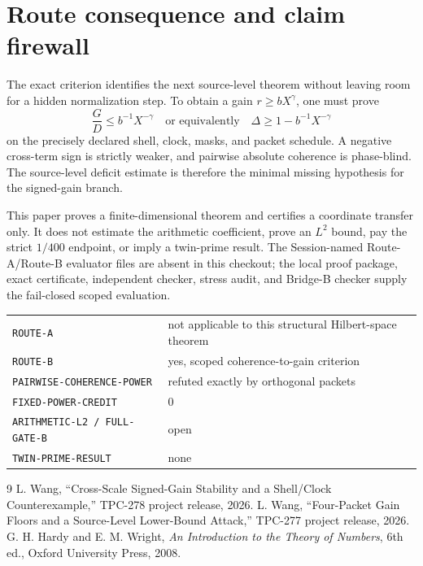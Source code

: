 \documentclass[11pt]{article}
\begin{document}
\section{Route consequence and claim firewall}

The exact criterion identifies the next source-level theorem without leaving
room for a hidden normalization step.  To obtain a gain
$r\geq bX^\gamma$, one must prove
\[
 \frac{G}{D}\leq b^{-1}X^{-\gamma}
 \quad\text{or equivalently}\quad
 \Delta\geq1-b^{-1}X^{-\gamma}
\]
on the precisely declared shell, clock, masks, and packet schedule.  A
negative cross-term sign is strictly weaker, and pairwise absolute coherence
is phase-blind.  The source-level deficit estimate is therefore the minimal
missing hypothesis for the signed-gain branch.

This paper proves a finite-dimensional theorem and certifies a coordinate
transfer only.  It does not estimate the arithmetic coefficient, prove an
$L^2$ bound, pay the strict $1/400$ endpoint, or imply a twin-prime result.
The Session-named Route-A/Route-B evaluator files are absent in this checkout;
the local proof package, exact certificate, independent checker, stress audit,
and Bridge-B checker supply the fail-closed scoped evaluation.

\begin{center}
\begin{tabular}{ll}
\texttt{ROUTE-A} & not applicable to this structural Hilbert-space theorem\\
\texttt{ROUTE-B} & yes, scoped coherence-to-gain criterion\\
\texttt{PAIRWISE-COHERENCE-POWER} & refuted exactly by orthogonal packets\\
\texttt{FIXED-POWER-CREDIT} & 0\\
\texttt{ARITHMETIC-L2 / FULL-GATE-B} & open\\
\texttt{TWIN-PRIME-RESULT} & none
\end{tabular}
\end{center}

\begin{thebibliography}{9}
 L. Wang, ``Cross-Scale Signed-Gain Stability and a
Shell/Clock Counterexample,'' TPC-278 project release, 2026.
 L. Wang, ``Four-Packet Gain Floors and a Source-Level
Lower-Bound Attack,'' TPC-277 project release, 2026.
 G. H. Hardy and E. M. Wright, \emph{An Introduction to the
Theory of Numbers}, 6th ed., Oxford University Press, 2008.
\end{thebibliography}
\end{document}
